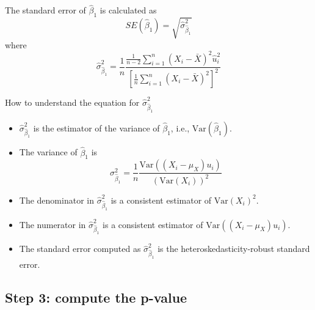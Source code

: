 \documentclass[presentation]{beamer}
\begin{document}
\begin{frame}[label={sec:org29883b0}]{The standard error of \(\hat{\beta}_1\) is calculated as}
\begin{equation}
\label{eq:se-b-1}
SE(\hat{\beta}_1) = \sqrt{\hat{\sigma}^2_{\hat{\beta}_1}}
\end{equation}
where
\begin{equation}
\label{eq:sigma-b-1}
\hat{\sigma}^2_{\hat{\beta}_1} = \frac{1}{n} \frac{\frac{1}{n-2} \sum_{i=1}^n (X_i - \bar{X})^2 \hat{u}^2_i}{\left[ \frac{1}{n} \sum_{i=1}^n (X_i - \bar{X})^2 \right]^2}
\end{equation}
\end{frame}

\begin{frame}[label={sec:org5ab5732}]{How to understand the equation for \(\hat{\sigma}^2_{\hat{\beta}_1}\)}
\begin{itemize}
\item \(\hat{\sigma}^2_{\hat{\beta}_1}\) is the estimator of the variance of
\(\hat{\beta}_1\), i.e., \(\mathrm{Var}(\hat{\beta}_1)\).

\item The variance of \(\hat{\beta}_1\) is
\[ \sigma^2_{\hat{\beta}_1} = \frac{1}{n} \frac{\mathrm{Var}\left( (X_i - \mu_X)u_i \right)}{\left( \mathrm{Var}(X_i) \right)^2} \]

\item The denominator in \(\hat{\sigma}^2_{\hat{\beta}_1}\) is a consistent
estimator of \(\mathrm{Var}(X_i)^2\).

\item The numerator in \(\hat{\sigma}^2_{\hat{\beta}_1}\) is a consistent
estimator of \(\mathrm{Var}((X_i - \mu_X)u_i)\).

\item The standard error computed as \(\hat{\sigma}^2_{\hat{\beta}_1}\) is
the \alert{heteroskedasticity-robust standard error}.
\end{itemize}
\end{frame}

\subsection*{Step 3: compute the p-value}
\label{sec:orgfdf1ab8}
\end{document}
